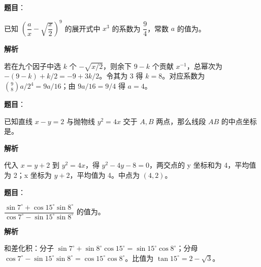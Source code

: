 \begin{answer}

\textbf{题目}：

已知 $\left(\dfrac ax-\sqrt{\dfrac x2}\right)^9$ 的展开式中 $x^3$ 的系数为 $\dfrac94$，常数 $a$ 的值为\gkblank{}。

\textbf{解析}

若在九个因子中选 $k$ 个 $-\sqrt{x/2}$，则余下 $9-k$ 个贡献 $x^{-1}$，总幂次为 $-(9-k)+k/2=-9+3k/2$。令其为 3 得 $k=8$。对应系数为 $\binom98a/2^4=9a/16$；由 $9a/16=9/4$ 得 $a=4$。


\end{answer}
\begin{answer}

\textbf{题目}：

已知直线 $x-y=2$ 与抛物线 $y^2=4x$ 交于 $A,B$ 两点，那么线段 $AB$ 的中点坐标是\gkblank{}。

\textbf{解析}

代入 $x=y+2$ 到 $y^2=4x$，得 $y^2-4y-8=0$，两交点的 y 坐标和为 4，平均值为 2；x 坐标为 $y+2$，平均值为 4。中点为 $(4,2)$。


\end{answer}
\begin{answer}

\textbf{题目}：

$\dfrac{\sin7^\circ+\cos15^\circ\sin8^\circ}{\cos7^\circ-\sin15^\circ\sin8^\circ}$ 的值为\gkblank{}。

\textbf{解析}

和差化积：分子 $\sin7^\circ+\sin8^\circ\cos15^\circ=\sin15^\circ\cos8^\circ$；分母 $\cos7^\circ-\sin15^\circ\sin8^\circ=\cos15^\circ\cos8^\circ$。比值为 $\tan15^\circ=2-\sqrt3$。


\end{answer}
